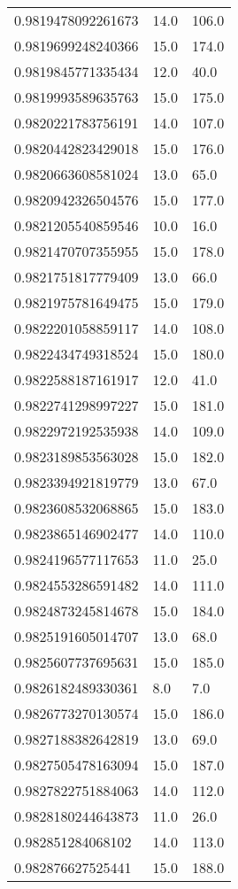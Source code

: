 \begin{center}
\begin{supertabular}[H]{p{0.30\textwidth}p{0.05\textwidth}p{0.05\textwidth}}
0.9819478092261673 & 14.0 & 106.0 \\ 
0.9819699248240366 & 15.0 & 174.0 \\ 
0.9819845771335434 & 12.0 & 40.0 \\ 
0.9819993589635763 & 15.0 & 175.0 \\ 
0.9820221783756191 & 14.0 & 107.0 \\ 
0.9820442823429018 & 15.0 & 176.0 \\ 
0.9820663608581024 & 13.0 & 65.0 \\ 
0.9820942326504576 & 15.0 & 177.0 \\ 
0.9821205540859546 & 10.0 & 16.0 \\ 
0.9821470707355955 & 15.0 & 178.0 \\ 
0.9821751817779409 & 13.0 & 66.0 \\ 
0.9821975781649475 & 15.0 & 179.0 \\ 
0.9822201058859117 & 14.0 & 108.0 \\ 
0.9822434749318524 & 15.0 & 180.0 \\ 
0.9822588187161917 & 12.0 & 41.0 \\ 
0.9822741298997227 & 15.0 & 181.0 \\ 
0.9822972192535938 & 14.0 & 109.0 \\ 
0.9823189853563028 & 15.0 & 182.0 \\ 
0.9823394921819779 & 13.0 & 67.0 \\ 
0.9823608532068865 & 15.0 & 183.0 \\ 
0.9823865146902477 & 14.0 & 110.0 \\ 
0.9824196577117653 & 11.0 & 25.0 \\ 
0.9824553286591482 & 14.0 & 111.0 \\ 
0.9824873245814678 & 15.0 & 184.0 \\ 
0.9825191605014707 & 13.0 & 68.0 \\ 
0.9825607737695631 & 15.0 & 185.0 \\ 
0.9826182489330361 & 8.0 & 7.0 \\ 
0.9826773270130574 & 15.0 & 186.0 \\ 
0.9827188382642819 & 13.0 & 69.0 \\ 
0.9827505478163094 & 15.0 & 187.0 \\ 
0.9827822751884063 & 14.0 & 112.0 \\ 
0.9828180244643873 & 11.0 & 26.0 \\ 
0.982851284068102 & 14.0 & 113.0 \\ 
0.982876627525441 & 15.0 & 188.0 \\ 

\end{supertabular}
\end{center}
